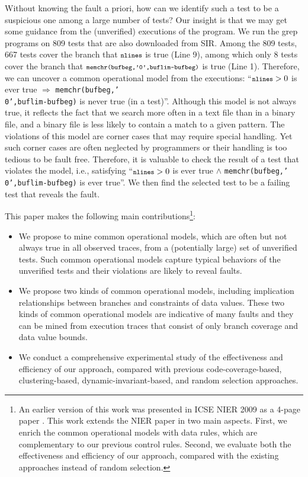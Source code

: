 \documentclass{sig-alternate}
\newcommand{\CodeIn}[1]{{\small\texttt{#1}}}
\begin{document}
Without knowing the fault a priori, how can we identify such a test
to be a suspicious one among a large number of tests? Our insight is
that we may get some guidance from the (unverified) executions of
the program. We run the grep programs on 809 tests that are also
downloaded from SIR. Among the 809 tests, 667 tests cover the branch
that $\CodeIn{nlines}$ is true (Line 9), among which only 8 tests
cover the branch that $\CodeIn{memchr(bufbeg,'\\0',buflim-bufbeg)}$
is true (Line 1). Therefore, we can uncover a common operational
model from the executions: ``$\CodeIn{nlines}>0$ is ever true
$\Rightarrow$ \CodeIn{memchr(bufbeg,'\\0',buflim-bufbeg)} is never
true (in a test)''. Although this model is not always true, it
reflects the fact that we search more often in a text file than in a
binary file, and a binary file is less likely to contain a match to
a given pattern. The violations of this model are corner cases that
may require special handling. Yet such corner cases are often
neglected by programmers or their handling is too tedious to be
fault free. Therefore, it is valuable to check the result of a test
that violates the model, i.e., satisfying ``$\CodeIn{nlines}>0$ is
ever true $\wedge$ \CodeIn{memchr(bufbeg,'\\0',buflim-bufbeg)} is
ever true''. We then find the selected test to be a failing test
that reveals the fault.


This paper makes the following main contributions\footnote{An
earlier version of this work was presented in ICSE NIER 2009 as a
4-page paper \cite{Zheng09}. This work extends the NIER paper in two
main aspects. First, we enrich the common operational models with
data rules, which are complementary to our previous control rules.
Second, we evaluate both the effectiveness and efficiency of our
approach, compared with the existing approaches instead of random
selection.}:



\begin{itemize}
\item
We propose to mine common operational models, which are often but
not always true in all observed traces, from a (potentially large)
set of unverified tests. Such common operational models capture
typical behaviors of the unverified tests and their violations are
likely to reveal faults.


\item
We propose two kinds of common operational models, including
implication relationships between branches and constraints of data
values. These two kinds of common operational models are indicative
of many faults and they can be mined from execution traces that
consist of only branch coverage and data value bounds.


\item

We conduct a comprehensive experimental study of the effectiveness
and efficiency of our approach, compared with previous
code-coverage-based, clustering-based, dynamic-invariant-based, and
random selection approaches.


\end{itemize}
\end{document}
